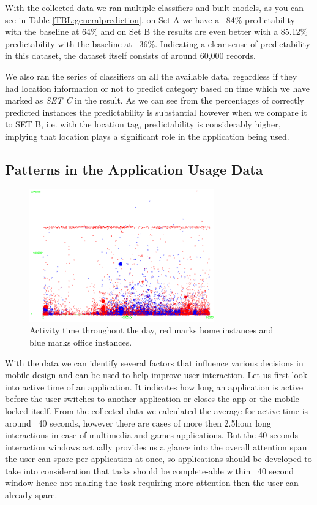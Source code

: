 \documentclass[prodmode,acmtecs]{acmsmall}
\begin{document}
With the collected data we ran multiple classifiers and built models, as you can see in Table
\ref{TBL:generalprediction}, on Set A we have a ~84\% predictability with the baseline at 64\% and on Set B the results are even better with a 85.12\% predictability with the baseline at ~36\%. Indicating a clear sense of predictability in this dataset, the dataset itself consists of around 60,000 records.

We also ran the series of classifiers on all the available data, regardless if they had location information or not to predict category based on time which we have marked as \textit{SET C} in the result. As we can see from the percentages of correctly predicted instances the predictability is substantial however when we compare it to SET B, i.e. with the location tag, predictability is considerably higher, implying that location plays a significant role in the application being used.

\subsection{Patterns in the Application Usage Data}

\begin{figure}[bhtp]
 \centering
 \includegraphics[width=80mm]{activity_start_time.png}
  \caption {Activity time throughout the day, red marks home instances and blue marks office instances.}
 \label{fig:appactivitytime}
\end{figure}

With the data we can identify several factors that influence various decisions in mobile design and can be used to help improve user interaction. Let us first look into active time of an application. It indicates how long an application is active before the user switches to another application or closes the app or the mobile locked itself. From the collected data we calculated the average for active time is around ~40 seconds, however there are cases of more then 2.5hour long interactions in case of multimedia and games applications. But the 40 seconds interaction windows actually provides us a glance into the overall attention span the user can spare per application at once, so applications should be developed to take into consideration that tasks should be complete-able within ~40 second window hence not making the task requiring more attention then the user can already spare. 
\end{document}
